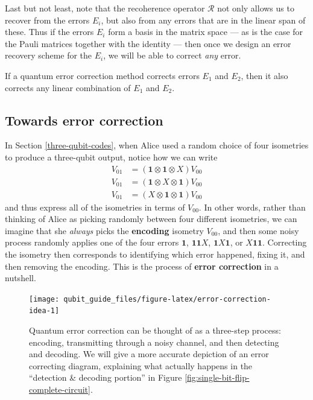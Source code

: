 \documentclass[fleqn,a4paper]{article}
\newenvironment{idea}{\everypar{\setlength{\parindent}{1.5em}}}{}
\theoremstyle{definition}
\theoremstyle{definition}
\theoremstyle{definition}
\theoremstyle{definition}
\theoremstyle{remark}
\begin{document}
Last but not least, note that the recoherence operator \(\mathcal{R}\) not only allows us to recover from the errors \(E_i\), but also from any errors that are in the linear span of these.
Thus if the errors \(E_i\) form a basis in the matrix space --- as is the case for the Pauli matrices together with the identity --- then once we design an error recovery scheme for the \(E_i\), we will be able to correct \emph{any} error.

\begin{idea}
If a quantum error correction method corrects errors \(E_1\) and \(E_2\), then it also corrects any linear combination of \(E_1\) and \(E_2\).

\end{idea}

\hypertarget{towards-error-correction}{%
\subsection{Towards error correction}\label{towards-error-correction}}

In Section \ref{three-qubit-codes}, when Alice used a random choice of four isometries to produce a three-qubit output, notice how we can write
\[
  \begin{aligned}
    V_{01}
    &= (\mathbf{1}\otimes\mathbf{1}\otimes X)V_{00}
  \\V_{01}
    &= (\mathbf{1}\otimes X\otimes\mathbf{1})V_{00}
  \\V_{01}
    &= (X\otimes\mathbf{1}\otimes\mathbf{1})V_{00}
  \end{aligned}
\]
and thus express all of the isometries in terms of \(V_{00}\).
In other words, rather than thinking of Alice as picking randomly between four different isometries, we can imagine that she \emph{always} picks the \textbf{encoding} isometry \(V_{00}\), and then some noisy process randomly applies one of the four errors \(\mathbf{1}\), \(\mathbf{1}\mathbf{1}X\), \(\mathbf{1}X\mathbf{1}\), or \(X\mathbf{1}\mathbf{1}\).
Correcting the isometry then corresponds to identifying which error happened, fixing it, and then removing the encoding.
This is the process of \textbf{error correction} in a nutshell.



\begin{figure}[H]

{\centering \texttt{[image: qubit\_guide\_files/figure-latex/error-correction-idea-1]} 

}

\caption{Quantum error correction can be thought of as a three-step process: encoding, transmitting through a noisy channel, and then detecting and decoding. We will give a more accurate depiction of an error correcting diagram, explaining what actually happens in the ``detection \& decoding portion'' in Figure \ref{fig:single-bit-flip-complete-circuit}.}\label{fig:error-correction-idea}
\end{figure}
\end{document}
